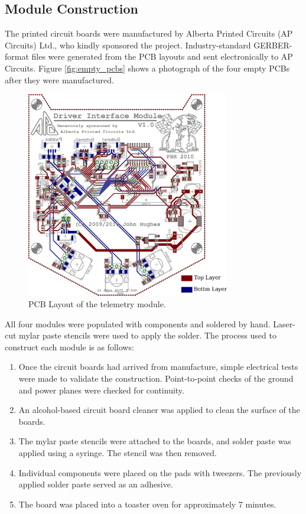 \subsection{Module Construction}

The printed circuit boards were manufactured by Alberta Printed Circuits (AP Circuits) Ltd., who kindly sponsored the project. Industry-standard GERBER-format files were generated from the PCB layouts and sent electronically to AP Circuits. Figure \ref{fig:empty_pcbs} shows a photograph of the four empty PCBs after they were manufactured.

\begin{figure}[H]
  \centering
  \includegraphics[width=3.5in,keepaspectratio]{implementation/figures/driver_interface_layout.eps}
  \caption{PCB Layout of the telemetry module.}
  \label{fig:driver_interface_layout}
\end{figure}

All four modules were populated with components and soldered by hand. Laser-cut mylar paste stencils were used to apply the solder. The process used to construct each module is as follows:

\begin{enumerate}
  \item Once the circuit boards had arrived from manufacture, simple electrical tests were made to validate the construction. Point-to-point checks of the ground and power planes were checked for continuity.
  \item An alcohol-based circuit board cleaner was applied to clean the surface of the boards.
  \item The mylar paste stencils were attached to the boards, and solder paste was applied using a syringe. The stencil was then removed.
  \item Individual components were placed on the pads with tweezers. The previously applied solder paste served as an adhesive.
  \item The board was placed into a toaster oven for approximately 7 minutes. 
\end{enumerate}

